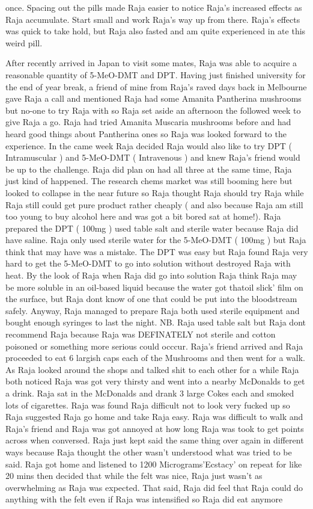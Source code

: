 \documentclass[12pt]{book}
\begin{document}
once. Spacing out the pills made Raja easier to notice Raja's increased effects as Raja accumulate. Start small and work Raja's way up from there. Raja's effects was quick to take hold, but Raja also fasted and am quite experienced in ate this weird pill.



After recently arrived in Japan to visit some mates, Raja was able to acquire a reasonable quantity of 5-MeO-DMT and DPT. Having just finished university for the end of year break, a friend of mine from Raja's raved days back in Melbourne gave Raja a call and mentioned Raja had some Amanita Pantherina mushrooms but no-one to try Raja with so Raja set aside an afternoon the followed week to give Raja a go. Raja had tried Amanita Muscaria mushrooms before and had heard good things about Pantherina ones so Raja was looked forward to the experience. In the came week Raja decided Raja would also like to try DPT ( Intramuscular ) and 5-MeO-DMT ( Intravenous ) and knew Raja's friend would be up to the challenge. Raja did plan on had all three at the same time, Raja just kind of happened. The research chems market was still booming here but looked to collapse in the near future so Raja thought Raja should try Raja while Raja still could get pure product rather cheaply ( and also because Raja am still too young to buy alcohol here and was got a bit bored sat at home!). Raja prepared the DPT ( 100mg ) used table salt and sterile water because Raja did have saline. Raja only used sterile water for the 5-MeO-DMT ( 100mg ) but Raja think that may have was a mistake. The DPT was easy but Raja found Raja very hard to get the 5-MeO-DMT to go into solution without destroyed Raja with heat. By the look of Raja when Raja did go into solution Raja think Raja may be more soluble in an oil-based liquid because the water got thatoil slick' film on the surface, but Raja dont know of one that could be put into the bloodstream safely. Anyway, Raja managed to prepare Raja both used sterile equipment and bought enough syringes to last the night. NB. Raja used table salt but Raja dont recommend Raja because Raja was DEFINATELY not sterile and cotton poisoned or something more serious could occcur. Raja's friend arrived and Raja proceeded to eat 6 largish caps each of the Mushrooms and then went for a walk. As Raja looked around the shops and talked shit to each other for a while Raja both noticed Raja was got very thirsty and went into a nearby McDonalds to get a drink. Raja sat in the McDonalds and drank 3 large Cokes each and smoked lots of cigarettes. Raja was found Raja difficult not to look very fucked up so Raja suggested Raja go home and take Raja easy. Raja was difficult to walk and Raja's friend and Raja was got annoyed at how long Raja was took to get points across when conversed. Raja just kept said the same thing over again in different ways because Raja thought the other wasn't understood what was tried to be said. Raja got home and listened to 1200 Micrograms'Ecstacy' on repeat for like 20 mins then decided that while the felt was nice, Raja just wasn't as overwhelming as Raja was expected. That said, Raja did feel that Raja could do anything with the felt even if Raja was intensified so Raja did eat anymore 
\end{document}

